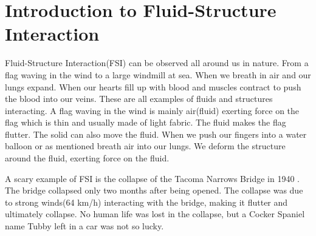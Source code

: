 \chapter{Introduction to Fluid-Structure Interaction}
Fluid-Structure Interaction(FSI) can be observed all around us in nature. From a flag waving in the wind to a large windmill at sea. 
When we breath in air and our lungs expand. When our hearts fill up with blood and muscles contract to push the blood into our veins. These are all examples of fluids and structures interacting. A flag waving in the wind is mainly air(fluid) exerting force on the flag which is thin and usually made of light fabric. The fluid makes the flag flutter. The solid can also move the fluid. When we push our fingers into a water balloon or as mentioned breath air into our lungs. We deform the structure around the fluid, exerting force on the fluid. \newline

A scary example of FSI is the collapse of the Tacoma Narrows Bridge in 1940 \cite{Billah1991}. The bridge collapsed only two months after being opened. The collapse was due to strong winds(64 km/h) interacting with the bridge, making it flutter and ultimately collapse. No human life was lost in the collapse, but a Cocker Spaniel name Tubby left in a car was not so lucky. \newline

